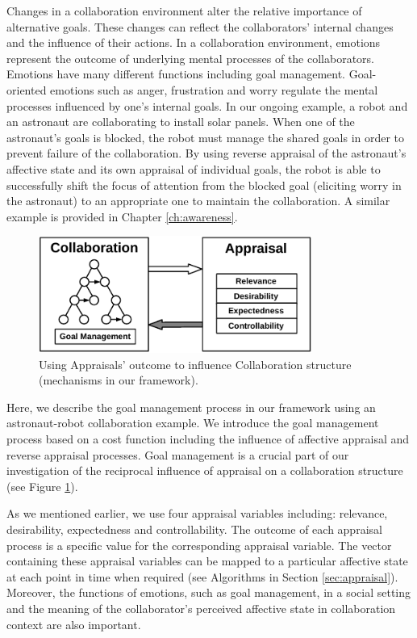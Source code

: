 \documentclass[12pt]{report}
\begin{document}
Changes in a collaboration environment alter the relative importance of
alternative goals. These changes can reflect the collaborators' internal changes
and the influence of their actions. In a collaboration environment, emotions
represent the outcome of underlying mental processes of the collaborators.
Emotions have many different functions
\cite{scheutz:architectural-action-selection} including goal management.
Goal-oriented emotions such as anger, frustration and worry regulate the mental
processes influenced by one's internal goals. In our ongoing example, a robot
and an astronaut are collaborating to install solar panels. When one of the
astronaut's goals is blocked, the robot must manage the shared goals in order to
prevent failure of the collaboration. By using reverse appraisal
\cite{gratch:reverse-appraisal} of the astronaut's affective state and its own appraisal
of individual goals, the robot is able to successfully shift the focus of
attention from the blocked goal (eliciting worry in the astronaut) to an
appropriate one to maintain the collaboration. A similar example is provided in
Chapter \ref{ch:awareness}.

\begin{figure}[t]
  \centering
  \includegraphics[width=0.8\textwidth]{figure/goal_management_croped.pdf}
  \caption{Using Appraisals' outcome to influence Collaboration structure
  (mechanisms in our framework).}
  \label{fig:appraisal-on-collaboration}
\end{figure}

Here, we describe the goal management process in our framework using an
astronaut-robot collaboration example. We introduce the goal management process
based on a cost function including the influence of affective appraisal and
reverse appraisal processes. Goal management is a crucial part of our
investigation of the reciprocal influence of appraisal on a collaboration
structure (see Figure \ref{fig:appraisal-on-collaboration}).

As we mentioned earlier, we use four appraisal variables including: relevance,
desirability, expectedness and controllability. The outcome of each appraisal
process is a specific value for the corresponding appraisal variable. The vector
containing these appraisal variables can be mapped to a particular affective state
at each point in time when required (see Algorithms in Section
\ref{sec:appraisal}). Moreover, the functions of emotions, such as goal
management, in a social setting and the meaning of the collaborator's perceived
affective state in collaboration context are also important.
\end{document}
